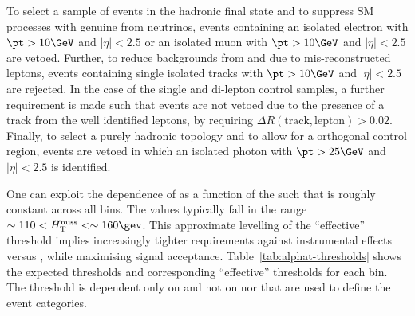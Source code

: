 To select a sample of events in the hadronic final state and to suppress SM processes with genuine \met from neutrinos, events
containing an isolated electron with $\pt > 10\GeV$ and $|\eta| < 2.5$ or an isolated muon with $\pt > 10\GeV$ and $|\eta| < 2.5$ are
vetoed. Further, to reduce backgrounds from \wj and \ttbar due to mis-reconstructed leptons, events containing single isolated tracks with $\pt > 10\GeV$ and $|\eta| < 2.5$ are rejected. In the case of the single and di-lepton control samples, a further
requirement is made such that events are not vetoed due to the presence of a track from the well identified leptons, by requiring
$\Delta R(\textrm{track},\textrm{lepton}) > 0.02$. Finally, to select a purely hadronic topology and to allow for a 
orthogonal control region, events are vetoed in which an isolated photon with $\pt > 25\GeV$ and $|\eta| < 2.5$ is identified.



One can exploit the dependence of  \alphat as a function of the \HT such that \mht is roughly constant across all \HT bins. 
The values typically fall in the range $\sim110 < \mht < \sim160\gev$. This approximate levelling of the ``effective'' \mht threshold implies
increasingly tighter requirements against instrumental effects versus \HT, while maximising signal acceptance. 
Table~\ref{tab:alphat-thresholds} shows the expected \alphat thresholds and corresponding ``effective'' \mht thresholds for each \HT bin. 
The \alphat threshold is dependent only on \HT and not on \njet nor \nb that are used to define the event categories.


